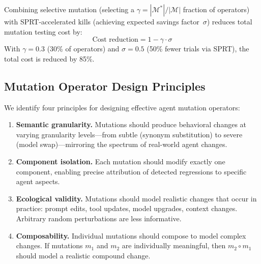 \begin{proposition}
\label{prop:mutation-cost}
Combining selective mutation (selecting a
$\gamma = |\mathcal{M}^*|/|\mathcal{M}|$ fraction of operators) with
SPRT\nobreakdash-accelerated kills (achieving expected savings
factor~$\sigma$) reduces total mutation testing cost by:
\begin{equation}
\label{eq:cost-reduction}
  \text{Cost reduction} = 1 - \gamma \cdot \sigma
\end{equation}
With $\gamma = 0.3$ (30\% of operators) and $\sigma = 0.5$ (50\% fewer
trials via SPRT), the total cost is reduced by 85\%.
\end{proposition}

\subsection{Mutation Operator Design Principles}
\label{sec:mutation:principles}

We identify four principles for designing effective agent mutation
operators:

\begin{enumerate}[leftmargin=*]
  \item \textbf{Semantic granularity.} Mutations should produce
    behavioral changes at varying granularity levels---from subtle
    (synonym substitution) to severe (model swap)---mirroring the
    spectrum of real-world agent changes.

  \item \textbf{Component isolation.} Each mutation should modify exactly
    one component, enabling precise attribution of detected regressions
    to specific agent aspects.

  \item \textbf{Ecological validity.} Mutations should model realistic
    changes that occur in practice: prompt edits, tool updates, model
    upgrades, context changes. Arbitrary random perturbations are less
    informative.

  \item \textbf{Composability.} Individual mutations should compose to
    model complex changes. If mutations $m_1$ and $m_2$ are individually
    meaningful, then $m_2 \circ m_1$ should model a realistic compound
    change.
\end{enumerate}
